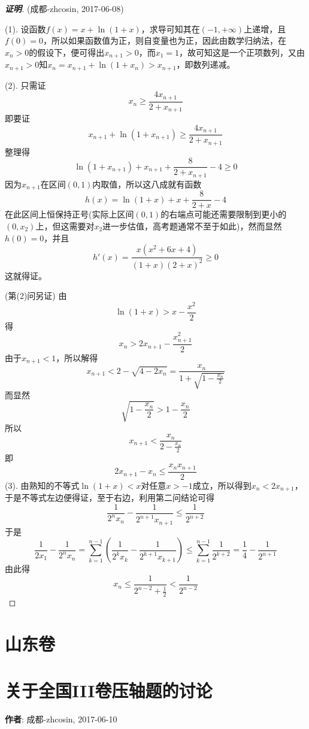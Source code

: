 \documentclass{ctexart}
\begin{document}
\begin{proof}[\textbf{证明}] (成都-zhcosin, 2017-06-08)

  (1). 设函数$f(x)=x+\ln{(1+x)}$，求导可知其在$(-1,+\infty)$上递增，且$f(0)=0$，所以如果函数值为正，则自变量也为正，因此由数学归纳法，在$x_n>0$的假设下，便可得出$x_{n+1}>0$，而$x_1=1$，故可知这是一个正项数列，又由$x_{n+1}>0$知$x_n=x_{n+1}+\ln{(1+x_n)}>x_{n+1}$，即数列递减。

  (2). 只需证
  \[ x_n \geqslant \frac{4x_{n+1}}{2+x_{n+1}} \]
  即要证
  \[ x_{n+1}+\ln{(1+x_{n+1})} \geqslant \frac{4x_{n+1}}{2+x_{n+1}} \]
  整理得
  \[ \ln{(1+x_{n+1})} + x_{n+1} + \frac{8}{2+x_{n+1}} -4 \geqslant 0 \]
  因为$x_{n+1}$在区间$(0,1)$内取值，所以这八成就有函数
  \[ h(x)=\ln{(1+x)}+x+\frac{8}{2+x}-4 \]
  在此区间上恒保持正号(实际上区间$(0,1)$的右端点可能还需要限制到更小的$(0,x_2)$上，但这需要对$x_2$进一步估值，高考题通常不至于如此)，然而显然$h(0)=0$，并且
  \[ h'(x) = \frac{x(x^2+6x+4)}{(1+x)(2+x)^2} \geqslant 0 \]
  这就得证。

  (第(2)问另证)
  由
  \[ \ln{(1+x)} > x-\frac{x^2}{2} \]
  得
  \[ x_n > 2x_{n+1}-\frac{x_{n+1}^2}{2} \]
  由于$x_{n+1}<1$，所以解得
  \[ x_{n+1} < 2-\sqrt{4-2x_n} = \frac{x_n}{1+\sqrt{1-\frac{x_n}{2}}} \]
  而显然
  \[ \sqrt{1-\frac{x_n}{2}} > 1-\frac{x_n}{2} \]
  所以
  \[ x_{n+1} < \frac{x_n}{2-\frac{x_n}{2}} \]
  即
  \[ 2x_{n+1}-x_n \leqslant \frac{x_nx_{n+1}}{2} \]
   (3). 由熟知的不等式$\ln{(1+x)}<x$对任意$x>-1$成立，所以得到$x_n<2x_{n+1}$，于是不等式左边便得证，至于右边，利用第二问结论可得
  \[ \frac{1}{2^nx_n}-\frac{1}{2^{n+1}x_{n+1}} \leqslant \frac{1}{2^{n+2}} \]
  于是
  \[ \frac{1}{2x_1} - \frac{1}{2^nx_n} = \sum_{k=1}^{n-1} \left( \frac{1}{2^kx_k}-\frac{1}{2^{k+1}x_{k+1}} \right) \leqslant \sum_{k=1}^{n-1}\frac{1}{2^{k+2}}=\frac{1}{4}-\frac{1}{2^{n+1}} \]
  由此得
  \[ x_n \leqslant \frac{1}{2^{n-2}+\frac{1}{2}} <\frac{1}{2^{n-2}} \]
\end{proof}

\section{山东卷}
\label{sec:shandong}

\newpage

\section{关于全国III卷压轴题的讨论}
\label{sec:discussion-about-nation-3-infty-product}

\textbf{作者}: 成都-zhcosin, 2017-06-10
\end{document}
